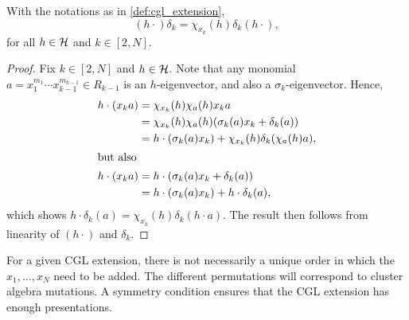 \begin{lemma}\label{lem:h_after_delta}
	With the notations as in \cref{def:cgl_extension},
	\begin{equation*}
		(h\cdot )\delta_k = \chi_{x_k}(h)\delta_k(h\cdot),
	\end{equation*}
	for all $h \in \mathcal{H}$ and $k \in [2, N]$.
\end{lemma}
\begin{proof}
	Fix $k \in [2, N]$ and $h \in \mathcal{H}$. Note that any monomial $a = x_1^{m_1}\cdots x_{k-1}^{m_{k-1}} \in R_{k-1}$ is an $h$-eigenvector, and also a $\sigma_k$-eigenvector. Hence,
	\begin{align*}
		h \cdot(x_k a)  & = \chi_{x_k}(h)\chi_{a}(h)x_ka                                      \\
		                & = \chi_{x_k}(h)\chi_{a}(h)(\sigma_k (a)x_k +  \delta_k(a))          \\
		                & = h \cdot (\sigma_k (a) x_k) + \chi_{x_k}(h)\delta_k(\chi_{a}(h)a), \\
		\shortintertext{but also}
		h \cdot (x_k a) & = h \cdot (\sigma_k (a) x_k + \delta_k(a))                          \\
		                & = h \cdot (\sigma_k (a) x_k) + h\cdot \delta_k(a),
	\end{align*}
	which shows $h \cdot \delta_k (a) = \chi_{x_k}(h) \delta_k (h \cdot a)$. The result then follows from linearity of $(h \cdot)$ and $\delta_k$.
\end{proof}

For a given CGL extension, there is not necessarily a unique order in which the $x_1,
	\dots, x_N$ need to be added. The different permutations will correspond to cluster
algebra mutations. A symmetry condition ensures that the CGL extension has enough
presentations.

